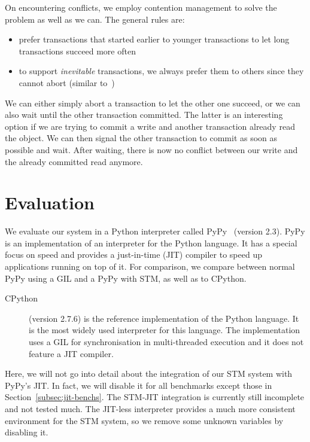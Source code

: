 \documentclass{sigplanconf}
\begin{document}
On encountering conflicts, we employ contention management to solve
the problem as well as we can. The general rules are:
\begin{itemize}[noitemsep]
\item prefer transactions that started earlier to younger transactions
  to let long transactions succeed more often
\item to support \emph{inevitable} transactions, we always prefer them
  to others since they cannot abort (similar to~\cite{blundell06})
\end{itemize}
We can either simply abort a transaction to let the other one succeed,
or we can also wait until the other transaction committed. The latter
is an interesting option if we are trying to commit a write and
another transaction already read the object. We can then signal the
other transaction to commit as soon as possible and wait. After
waiting, there is now no conflict between our write and the already
committed read anymore.



\section{Evaluation}

We evaluate our system in a Python interpreter called
PyPy~\cite{pypy} (version 2.3). PyPy is an implementation of an
interpreter for the Python language. It has a special focus on speed
and provides a just-in-time (JIT) compiler to speed up applications
running on top of it. For comparison, we compare between normal PyPy
using a GIL and a PyPy with STM, as well as to CPython.
\begin{description}
\item[CPython] (version 2.7.6) is the reference implementation of the Python
  language. It is the most widely used interpreter for this language.
  The implementation uses a GIL for synchronisation in multi-threaded
  execution and it does not feature a JIT compiler.
\end{description}

Here, we will not go into detail about the integration of our STM
system with PyPy's JIT. In fact, we will disable it for all benchmarks
except those in Section~\ref{subsec:jit-benchs}. The STM-JIT
integration is currently still incomplete and not tested much. The
JIT-less interpreter provides a much more consistent environment for
the STM system, so we remove some unknown variables by disabling it.
\end{document}
